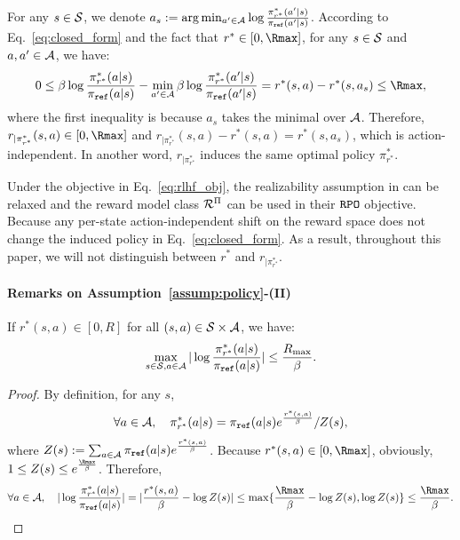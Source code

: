 For any $s\in\mathcal{S}$, we denote $a_s := \arg\min_{a'\in\mathcal{A}} \log \frac{\pi^*_{r^*}(a'|s)}{\pi_{\texttt{ref}}(a'|s)}$.
According to Eq.~\eqref{eq:closed_form} and the fact that $r^* \in [0, {\Rmax}]$, for any $s\in\mathcal{S}$ and $a,a'\in\mathcal{A}$, we have:
\begin{align*}
    0 \leq \beta\log\frac{\pi^*_{r^*}(a|s)}{\pi_\textref(a|s)} - \min_{a'\in\cA}\beta \log \frac{\pi^*_{r^*}(a'|s)}{\pi_\textref(a'|s)} = r^*(s,a) - r^*(s,a_s) \leq {\Rmax},
\end{align*}
where the first inequality is because $a_s$ takes the minimal over $\mathcal{A}$.
Therefore, $r_{|\pi^*_{r^*}}(s,a) \in [0, {\Rmax}]$ and $r_{|\pi^*_{r^*}}(s,a) - r^*(s,a) = r^*(s,a_s)$, which is action-independent.
In another word, $r_{|\pi^*_{r^*}}$ induces the same optimal policy $\pi^*_{r^*}$.

Under the objective in Eq.~\eqref{eq:rlhf_obj}, the realizability assumption in \citep{liu2024provably} can be relaxed and the reward model class $\mathcal{R}^{\Pi}$ can be used in their ${\texttt{RPO}}$ objective. Because any per-state action-independent shift on the reward space does not change the induced policy in Eq.~\eqref{eq:closed_form}.
As a result, throughout this paper, we will not distinguish between $r^*$ and $r_{|\pi^*_{r^*}}$.

\paragraph{Remarks on Assumption~\ref{assump:policy}-(II)}
\begin{lemma}\label{lem:bounded_ratio}
    If $r^*(s,a)\in[0, R]$ for all $(s,a)\in\mathcal{S}\times\mathcal{A}$, we have:
    \begin{align*}
        \max_{s\in\mathcal{S},a\in\mathcal{A}} |\log\frac{\pi^*_{r^*}(a|s)}{\pi_{{\texttt{ref}}}(a|s)}| \leq \frac{R_{\max}}{\beta}.
    \end{align*}
\end{lemma}
\begin{proof}
    By definition, for any $s$, 
    \begin{align*}
        \forall a\in\mathcal{A},\quad \pi^*_{r^*}(a|s) = \pi_{{\texttt{ref}}}(a|s) e^{\frac{r^*(s,a)}{\beta}} / Z(s),
    \end{align*}
    where $Z(s) := \sum_{a\in\mathcal{A}} \pi_{{\texttt{ref}}}(a|s) e^{\frac{r^*(s,a)}{\beta}}$.
    Because $r^*(s,a) \in [0, \Rmax]$, obviously, $1 \leq Z(s) \leq e^{\frac{\Rmax}{\beta}}$. Therefore,
    \begin{align*}
        \forall a\in\cA,\quad |\log\frac{\pi^*_{r^*}(a|s)}{\pi_{\textref}(a|s)}| = |\frac{r^*(s,a)}{\beta} - \log Z(s)| \leq \max\{\frac{\Rmax}{\beta} - \log Z(s), \log Z(s)\} \leq \frac{\Rmax}{\beta}.
    \end{align*}
\end{proof}

